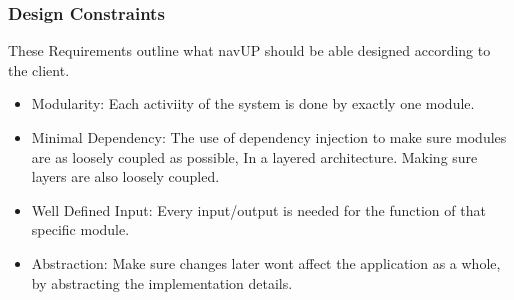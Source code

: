 \documentclass{article}
\begin{document}
 	\subsubsection{Design Constraints}
 	These Requirements outline what navUP should be able designed according to the client.
 	\begin{itemize}
 		\item Modularity:
 		Each activiity of the system is done by exactly one module. 
 		
 		\item Minimal Dependency:
 		The use of dependency injection to make sure modules are as loosely coupled as possible, In a layered architecture. Making sure layers are also loosely coupled.
 		
 		\item Well Defined Input:
 		Every input/output is needed for the function of that specific module.
 		
 		\item Abstraction:
 		Make sure changes later wont affect the application as a whole, by abstracting the implementation details.
 	\end{itemize}
 	
\end{document}
